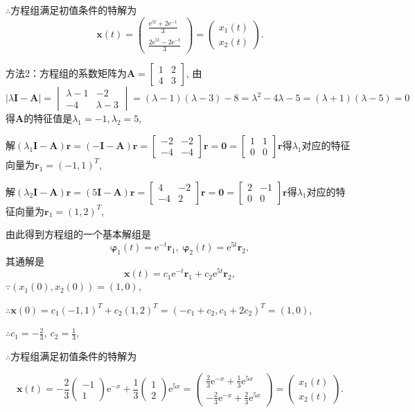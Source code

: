 \documentclass[12pt,UTF8]{ctexart}
\newcommand{\me}[0]{\mathrm e}
\begin{document}
\begin{enumerate}
$\therefore$方程组满足初值条件的特解为
\[\bm x(t)=\begin{pmatrix}\frac{\me^{5t}+2\me^{-t}}3\\\frac{2\me^{5t}-2\me^{-t}}3\end{pmatrix}=\begin{pmatrix}x_1(t)\\x_2(t)\end{pmatrix}.\]

方法2：方程组的系数矩阵为$\bm A=\begin{bmatrix}1&2\\4&3\end{bmatrix}$, 由$|\lambda\bm I-\bm A|=\begin{vmatrix}\lambda-1&-2\\-4&\lambda-3\end{vmatrix}=(\lambda-1)(\lambda-3)-8=\lambda^2-4\lambda-5=(\lambda+1)(\lambda-5)=0$得$\bm A$的特征值是$\lambda_1=-1,\lambda_2=5$,

解$(\lambda_1\bm I-\bm A)\bm r=(-\bm I-\bm A)\bm r=\begin{bmatrix}-2&-2\\-4&-4\end{bmatrix}\bm r=\bm0=\begin{bmatrix}1&1\\0&0\end{bmatrix}\bm r$得$\lambda_1$对应的特征向量为$\bm r_1=(-1,1)^T$,

解$(\lambda_2\bm I-\bm A)\bm r=(5\bm I-\bm A)\bm r=\begin{bmatrix}4&-2\\-4&2\end{bmatrix}\bm r=\bm0=\begin{bmatrix}2&-1\\0&0\end{bmatrix}\bm r$得$\lambda_1$对应的特征向量为$\bm r_1=(1,2)^T$,

由此得到方程组的一个基本解组是
\[\bm\varphi_1(t)=\me^{-t}\bm r_1,\ \bm\varphi_2(t)=\me^{5t}\bm r_2,\]
其通解是
\[\bm x(t)=c_1\me^{-t}\bm r_1+c_2\me^{5t}\bm r_2,\]
$\because(x_1(0),x_2(0))=(1,0)$,

$\therefore\bm x(0)=c_1(-1,1)^T+c_2(1,2)^T=(-c_1+c_2,c_1+2c_2)^T=(1,0)$,

$\therefore c_1=-\frac23,\ c_2=\frac13$,

$\therefore$方程组满足初值条件的特解为

\[\bm x(t)=-\frac23\begin{pmatrix}-1\\1\end{pmatrix}\me^{-x}+\frac13\begin{pmatrix}1\\2\end{pmatrix}\me^{5x}=\begin{pmatrix}\frac23\me^{-x}+\frac13\me^{5x}\\-\frac23\me^{-x}+\frac23\me^{5x}\end{pmatrix}=\begin{pmatrix}x_1(t)\\x_2(t)\end{pmatrix}.\]


\end{enumerate}
\end{document}
